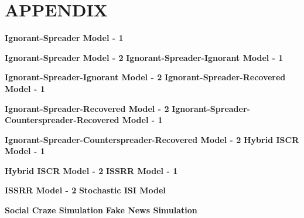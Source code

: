 \chapter*{APPENDIX} %
\noindent \textbf{Ignorant-Spreader Model - 1}

\textbf{Ignorant-Spreader Model - 2}
\noindent 
\noindent \textbf{Ignorant-Spreader-Ignorant Model - 1}

\textbf{Ignorant-Spreader-Ignorant Model - 2}
\noindent 
\noindent \textbf{Ignorant-Spreader-Recovered Model - 1}

\textbf{Ignorant-Spreader-Recovered Model - 2}
\noindent 
\noindent \textbf{Ignorant-Spreader-Counterspreader-Recovered Model - 1}

\textbf{Ignorant-Spreader-Counterspreader-Recovered Model - 2}
\noindent 
\noindent \textbf{Hybrid ISCR Model - 1}

\textbf{Hybrid ISCR Model - 2}
\noindent 
\noindent \textbf{ISSRR Model - 1}

\textbf{ISSRR Model - 2}
\noindent 
\noindent \textbf{Stochastic ISI Model}

\textbf{Social Craze Simulation}
\noindent 
\textbf{Fake News Simulation}
\noindent 